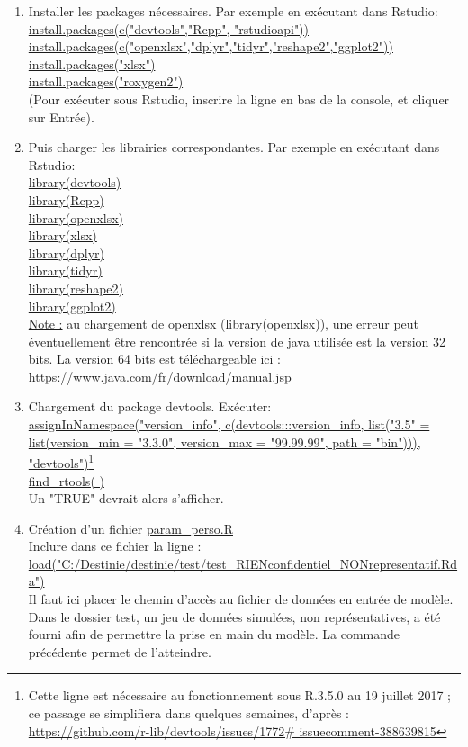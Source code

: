 \begin{enumerate}
\item Installer les packages nécessaires.
Par exemple en exécutant dans Rstudio:\\
\url{install.packages(c("devtools","Rcpp", "rstudioapi"))}\\ \url{install.packages(c("openxlsx","dplyr","tidyr","reshape2","ggplot2"))}\\  
\url{install.packages("xlsx")}\\
\url{install.packages("roxygen2")}\\
(Pour exécuter sous Rstudio, inscrire la ligne en bas de la console, et cliquer sur Entrée).\\

\item Puis charger les librairies correspondantes.
Par exemple en exécutant dans Rstudio:\\
    \url{library(devtools)} \\
    \url{library(Rcpp)} \\
    \url{library(openxlsx)} \\
    \url{library(xlsx)} \\
    \url{library(dplyr)} \\
    \url{library(tidyr)} \\
    \url{library(reshape2)} \\
    \url{library(ggplot2)} \\
\underline{Note :} au chargement de openxlsx (library(openxlsx)), une erreur peut éventuellement être rencontrée si la version de java utilisée est la version 32 bits. La version 64 bits est téléchargeable ici : \url{https://www.java.com/fr/download/manual.jsp}\\

\item Chargement du package devtools. Exécuter: \\
 \url{assignInNamespace("version_info", c(devtools:::version_info, list("3.5" = list(version_min = "3.3.0", version_max = "99.99.99", path = "bin"))), "devtools")}\footnote{Cette ligne est nécessaire au fonctionnement sous R.3.5.0 au 19 juillet 2017 ; ce passage se simplifiera dans quelques semaines, d’après : \url{https://github.com/r-lib/devtools/issues/1772\# issuecomment-388639815}}  \\
 
 \url{find_rtools( )}  \\
 Un "TRUE" devrait alors s'afficher.
 
 \item Création d'un fichier \url{param_perso.R} \\
Inclure dans ce fichier la ligne : \\
\url{load("C:/Destinie/destinie/test/test_RIENconfidentiel_NONrepresentatif.Rda")}\\
Il faut ici placer le chemin d'accès au fichier de données en entrée de modèle. Dans le dossier test, un jeu de données simulées, non représentatives, a été fourni afin de permettre la prise en main du modèle. La commande précédente permet de l'atteindre.\\


\end{enumerate}
